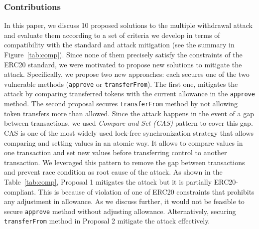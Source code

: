 \subsubsection*{Contributions} In this paper, we discuss 10 proposed solutions to the multiple withdrawal attack and evaluate them according to a set of criteria we develop in terms of compatibility with the standard and attack mitigation (see the summary in Figure~\ref{tab:comp}). Since none of them precisely satisfy the constraints of the ERC20 standard, we were motivated to propose new solutions to mitigate the attack. Specifically, we propose two new approaches: each secures one of the two vulnerable methods (\ie \texttt{approve} or \texttt{transferFrom}). The first one, mitigates the attack by comparing transferred tokens with the current allowance in the \texttt{approve} method. The second proposal secures \texttt{transferFrom} method by not allowing token transfers more than allowed. Since the attack happens in the event of a gap between transactions, we used \textit{Compare and Set (CAS)} pattern\cite{Ref06} to cover this gap. CAS is one of the most widely used lock-free synchronization strategy that allows comparing and setting values in an atomic way. It allows to compare values in one transaction and set new values before transferring control to another transaction. We leveraged this pattern to remove the gap between transactions and prevent race condition as root cause of the attack. As shown in the Table~\ref{tab:comp}, Proposal 1 mitigates the attack but it is partially ERC20-compliant. This is because of violation of one of ERC20 constraints that prohibits any adjustment in allowance. As we discuss further, it would not be feasible to secure \texttt{approve} method without adjusting allowance. Alternatively, securing \texttt{transferFrom} method in Proposal 2 mitigate the attack effectively.

